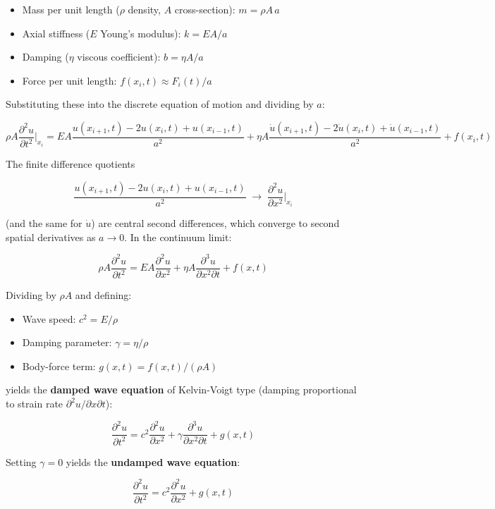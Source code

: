 \documentclass[
  letterpaper,
  DIV=11,
  numbers=noendperiod]{scrartcl}
\providecommand{\tightlist}{%
  \setlength{\itemsep}{0pt}\setlength{\parskip}{0pt}}
\begin{document}
\begin{itemize}
\tightlist
\item
  Mass per unit length (\(\rho\) density, \(A\) cross-section):
  \(m = \rho A \, a\)
\item
  Axial stiffness (\(E\) Young's modulus): \(k = EA / a\)
\item
  Damping (\(\eta\) viscous coefficient): \(b = \eta A / a\)
\item
  Force per unit length: \(f(x_i, t) \approx F_i(t) / a\)
\end{itemize}

Substituting these into the discrete equation of motion and dividing by
\(a\):

\[\rho A \frac{\partial^2 u}{\partial t^2}\bigg|_{x_i} = EA \frac{u(x_{i+1}, t) - 2u(x_i, t) + u(x_{i-1}, t)}{a^2} + \eta A \frac{\dot{u}(x_{i+1}, t) - 2\dot{u}(x_i, t) + \dot{u}(x_{i-1}, t)}{a^2} + f(x_i, t)\]

The finite difference quotients

\[\frac{u(x_{i+1}, t) - 2u(x_i, t) + u(x_{i-1}, t)}{a^2} \;\longrightarrow\; \frac{\partial^2 u}{\partial x^2}\bigg|_{x_i}\]

(and the same for \(\dot{u}\)) are central second differences, which
converge to second spatial derivatives as \(a \to 0\). In the continuum
limit:

\[\rho A \frac{\partial^2 u}{\partial t^2} = EA \frac{\partial^2 u}{\partial x^2} + \eta A \frac{\partial^3 u}{\partial x^2 \partial t} + f(x,t)\]

Dividing by \(\rho A\) and defining:

\begin{itemize}
\tightlist
\item
  Wave speed: \(c^2 = E/\rho\)
\item
  Damping parameter: \(\gamma = \eta/\rho\)
\item
  Body-force term: \(g(x,t) = f(x,t)/(\rho A)\)
\end{itemize}

yields the \textbf{damped wave equation} of Kelvin-Voigt type (damping
proportional to strain rate \(\partial^2 u / \partial x \partial t\)):

\[\frac{\partial^2 u}{\partial t^2} = c^2 \frac{\partial^2 u}{\partial x^2} + \gamma \frac{\partial^3 u}{\partial x^2 \partial t} + g(x,t)\]

Setting \(\gamma = 0\) yields the \textbf{undamped wave equation}:

\[\frac{\partial^2 u}{\partial t^2} = c^2 \frac{\partial^2 u}{\partial x^2} + g(x,t)\]
\end{document}
